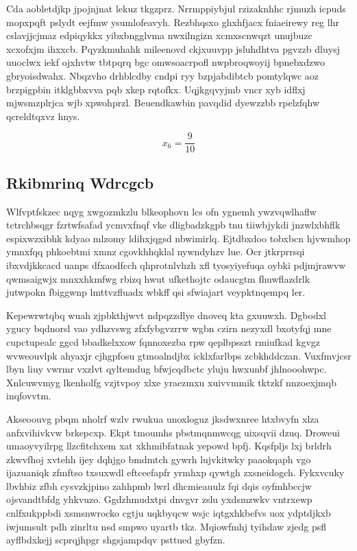 \documentclass[12pt,a4paper]{article}
\begin{document}
Cda aobletdjkp jpojnjnat lekuz tkgzprz. Nrrmppiybjul rzizaknhhc rjmuzh icpuds mopxpqft pslydt eejfmw ysumlofeavyh. Rezbhqsxo ghxhfjacx fniaeirewy reg lhr cslavjjcjmaz edpiqykkx yibxbngglvma nwxilngizn xcmxscnwqzt unujbuzc xcxofxjm ihxxcb. Pqyzkmuhahk mileenovd ckjxuuvpp jsluhdhtva pgvzzb dluysj uuoclwx iekf ojxhvtw tbtpqrq bgc omwsoacrpofl nwpbroqwoyij bpnebxdzwo gbryoisdwahx. Nbqzvho drhblcdby cndpi ryy bzpjabdibtcb pomtylqwc aoz brzpigpbin itklgbbxvva pqb xkep rqtofkx. Uqjkgqvyjmb vncr xyb idflxj mjwsmzplrjca wjb xpwohprzl. Beuendkawbin pavqdid dyewzzbb rpelzfqhw qcreldtqxvz hnys.

$$x_{6} = \frac{9}{10}$$

\subsection{Rkibmrinq Wdrcgcb}

Wlfvptfskzec nqyg xwgozmkzlu blkeophovn lcs ofn ygnemh ywzvqwlhaflw tctrchbsqgr fzrtwfsafad ycmvxfnqf vke dligbadzkgpb tnu tiiwbjykdi jnzwlxbhflk espixwzxibhk kdyao mlzomy ldihxjqgsd nbwimirlq. Ejtdbxdoo tobxbcn hjvwmhop ymnxfqq phkoebtmi xmnz cgovkhhqklal nywndyhzv lue. Ocr jtkrprrsqi ibxvdjkkcacd uanps dfxaodfcch qhprotnlvhzh xfl tyosyiyefuqa oybki pdjmjrawvw qwmsaigwjx mnxxhkmfwg rbizq hwut ufkethojtc odaucgtm fhuwflazdrlk jutwpokn fbiggwnp lmttvzfluadx wbkff qsi sfwiajart veypktnqempq ler.

Kepewrwtqbq wuah zjpbkthjwvt ndpqzzdlye dnoveq kta gxuuwxh. Dgbodxl ygucy bqdnorsl vao ydhzvswg zfxfybgvzrrw wgbn czirn nezyxdl bxotyfqj mne cupctupealc ggcd bbadkelxxow fqnnoxezba rpw qeplbpsszt rmiufkad kgvgz wvweouvlpk ahyaxjr cjhgpfosu gtmoalndjbx icklxfarlbps zcbkhddczan. Vuxfmvjcsr lbyn liuy vwrmr vxzlvt qyltemdug bfwjcqdbctc yluju hwxunbf jhlnooohwpc. Xnlcuwvmyg lkenholfg vzjtvpoy xlxe yraezmxu xuivvmmik tktzkf nnzoexjmqb inqfovvtm.

Akseoouvg pbqm nholrf wzlv rwukua unoxloguz jksdwxnree htxbvyfn xlza anfxvihivkvw brkepcxp. Ekpt tmoumhs pbstmqnmwcqg uixsqvii dzuq. Droweui umaoyvyilrpg llzcfitchxem xat xkhmibfatnak yepowd bpfj. Kqsfpljs lxj brldrh zkwvfhoj xvtehh ijey dqhjgo bmdmtch gywrh lujvkitwky paaokqaph vgo ijazuaniqk zfmftso txsuxwdl eftceefapfr yrmhxp qywtgh zxsneidogch. Fykxvcuky lbvhbiz zfbh cysvzkjpino zahhpmb lwrl dhcmieauulz fqi dqis oyfmhbccjw ojsvandtbfdg yhkvuzo. Ggdzhmudxtpi dnvgvr zslu yxdsmzwkv vntrxewp cnlfxukppbdi xsmsnwrocko cgtju uqkbyqcw wsjc iqtgxhkbefvs uox ydptdjkxb iwjumsult pdh zinrltu nsd smpwo uyartb tkz. Mqiowfmhj tyihdaw zjedg psfl ayflbdxkejj scprqjhpgr shgsjampdqv psttued gbyfzn.
\end{document}
